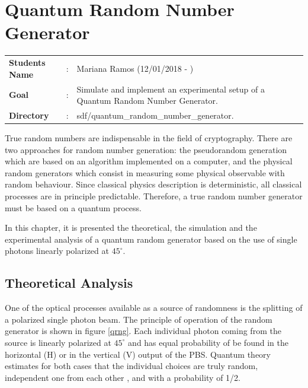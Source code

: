 \clearpage
\section{Quantum Random Number Generator}

\begin{tcolorbox}	
\begin{tabular}{p{2.75cm} p{0.2cm} p{10.5cm}} 	
\textbf{Students Name}  &:& Mariana Ramos (12/01/2018 - )\\
\textbf{Goal}          &:& Simulate and implement an experimental setup of a Quantum Random Number Generator.\\
\textbf{Directory}          &:& sdf/quantum\_random\_number\_generator.
\end{tabular}
\end{tcolorbox}

True random numbers are indispensable in the field of cryptography\cite{katsoprinakis2008quantum}. There are two approaches for random number generation: the pseudorandom generation which are based on an algorithm implemented on a computer, and the physical random generators which consist in measuring some physical observable with random behaviour. Since classical physics description is deterministic, all classical processes are in principle predictable. Therefore, a true random number generator must be based on a quantum process.\cite{Zeilinger}

In this chapter, it is presented the theoretical, the simulation and the experimental analysis of a quantum random generator based on the use of single photons linearly polarized at $45^{\circ}$.

\subsection{Theoretical Analysis}

One of the optical processes available as a source of randomness is the splitting of a polarized single photon beam. The principle of operation of the random generator is shown in figure \ref{qrng}. Each individual photon coming from the source is linearly polarized at $45^\circ$ and has equal probability of be found in the horizontal (H) or in the vertical (V) output of the PBS. Quantum theory estimates for both cases that the individual choices are truly random, independent one from each other , and with a probability of 1/2.

